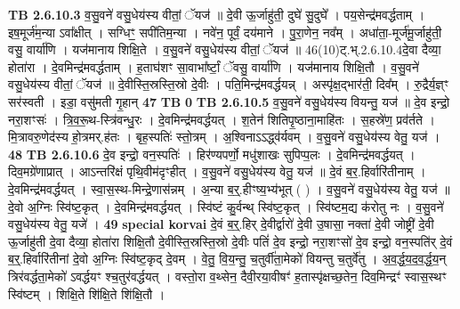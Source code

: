 \documentclass[17pt]{extarticle}
\begin{document}
                                \textbf{ TB 2.6.10.3} \newline
                  व॒सु॒वने॑ वसु॒धेय॑स्य वीतां॒ ॅयज॑ ॥ दे॒वी ऊ॒र्जाहु॑ती॒ दुघे॑ सु॒दुघे᳚ । पय॒सेन्द्र॑मवर्द्धताम् । इष॒मूर्ज॑म॒न्या ऽवा᳚क्षीत् । सग्धिꣳ॒॒ सपी॑तिम॒न्या । नवे॑न॒ पूर्वं॒ दय॑माने । पु॒रा॒णेन॒ नव᳚म् । अधा॑ता॒-मूर्ज॑मू॒र्जाहु॑ती॒ वसु॒ वार्या॑णि । यज॑मानाय शिक्षि॒ते । व॒सु॒वने॑ वसु॒धेय॑स्य वीतां॒ ॅयज॑ ॥ 46(10)ट्.भ्.2.6.10.4दे॒वा दैव्या॒ होता॑रा । दे॒वमिन्द्र॑मवर्द्धताम् । ह॒ताघ॑शꣳ सा॒वाभा᳚र्ष्टां॒ ॅवसु॒ वार्या॑णि । यज॑मानाय शिक्षि॒तौ । व॒सु॒वने॑ वसु॒धेय॑स्य वीतां॒ ॅयज॑ ॥ दे॒वीस्ति॒स्रस्ति॒स्रो दे॒वीः । पति॒मिन्द्र॑मवर्द्धयन्न् । अस्पृ॑क्ष॒द्भार॑ती॒ दिव᳚म् । रु॒द्रैर्य॒ज्ञ्ꣳ सर॑स्वती । इडा॒ वसु॑मती गृ॒हान् \textbf{ 47} \newline
                  \newline
                                \textbf{ TB } \newline
                   \textbf{ 0} \newline
                  \newline
                                \textbf{ TB 2.6.10.5} \newline
                  व॒सु॒वने॑ वसु॒धेय॑स्य वियन्तु॒ यज॑ ॥ दे॒व इन्द्रो॒ नरा॒शꣳसः॑ । त्रि॒व॒रू॒थ-स्त्रि॑वन्धु॒रः । दे॒वमिन्द्र॑मवर्द्धयत् । श॒तेन॑ शितिपृ॒ष्ठाना॒माहि॑तः । स॒हस्रे॑ण॒ प्रव॑र्तते । मि॒त्रावरु॒णेद॑स्य हो॒त्रमर्.ह॑तः । बृह॒स्पतिः॑ स्तो॒त्रम् । अ॒श्विनाऽऽद्ध्व॑र्यवम् । व॒सु॒वने॑ वसु॒धेय॑स्य वेतु॒ यज॑ । \textbf{ 48} \newline
                  \newline
                                \textbf{ TB 2.6.10.6} \newline
                  दे॒व इन्द्रो॒ वन॒स्पतिः॑ । हिर॑ण्यपर्णो॒ मधु॑शाखः सुपिप्प॒लः । दे॒वमिन्द्र॑मवर्द्धयत् । दिव॒मग्रे॑णाप्रात् । आऽन्तरि॑क्षं पृथि॒वीम॑दृꣳहीत् । व॒सु॒वने॑ वसु॒धेय॑स्य वेतु॒ यज॑ ॥ दे॒वं ब॒र॒.हिर्वारि॑तीनाम् । दे॒वमिन्द्र॑मवर्द्धयत् । स्वा॒स॒स्थ-मिन्द्रे॒णास॑न्नम् । अ॒न्या ब॒र्॒.हीꣳष्य॒भ्य॑भूत् ( ) । व॒सु॒वने॑ वसु॒धेय॑स्य वेतु॒ यज॑ ॥ दे॒वो अ॒ग्निः स्वि॑ष्ट॒कृत् । दे॒वमिन्द्र॑मवर्द्धयत् । स्वि॑ष्टं कु॒र्वन्थ् स्वि॑ष्ट॒कृत् । स्वि॑ष्टम॒द्य क॑रोतु नः । व॒सु॒वने॑ वसु॒धेय॑स्य वेतु॒ यजे॑ । \textbf{ 49} \newline
                  \newline
                                                        \textbf{special korvai} \newline
              दे॒वं ब॒र्॒.हिर् दे॒वीर्द्वारो॑ दे॒वी उ॒षासा॒ नक्ता॑ दे॒वी जोष्ट्री॑ दे॒वी ऊ॒र्जाहु॑ती दे॒वा दैव्या॒ होता॑रा शिक्षि॒तौ दे॒वीस्ति॒स्रस्ति॒स्रो दे॒वीः पतिं॑ दे॒व इन्द्रो॒ नरा॒शꣳसो॑ दे॒व इन्द्रो॒ वन॒स्पति॑र् दे॒वं ब॒र्॒.हिर्वारि॑तीनां दे॒वो अ॒ग्निः स्वि॑ष्ट॒कृद् दे॒वम् । वे॒तु॒ वि॒य॒न्तु॒ च॒तुर्वी॑ता॒मेको॑ वियन्तु च॒तुर्वे॑तु । अ॒व॒र्द्ध॒य॒द॒व॒र्द्ध॒य॒न् त्रिर॑वर्द्धता॒मेको॑ ऽवर्द्धयꣳ श्च॒तुर॑वर्द्धयत् । वस्तो॒रा व॒थ्सेन॒ दैवी॒रया॒वीषꣳ॑ ह॒तास्पृ॑क्षच्छ॒तेन॒ दिव॒मिन्द्रꣳ॑ स्वास॒स्थꣳ स्वि॑ष्टम् । शिक्षि॒ते शि॑क्षि॒ते शि॑क्षि॒तौ । \newline
\end{document}
